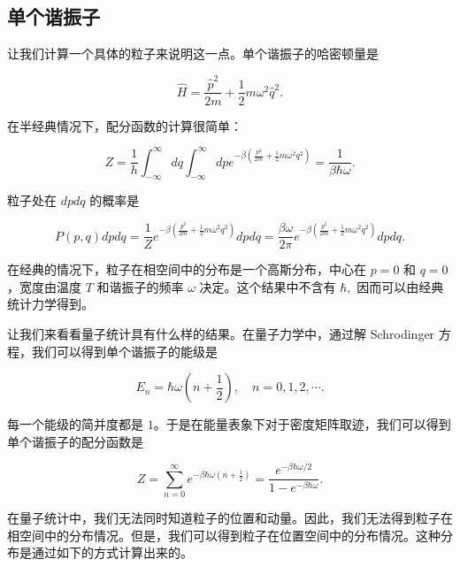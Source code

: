 \subsection{单个谐振子}
让我们计算一个具体的粒子来说明这一点。单个谐振子的哈密顿量是
\begin{linenomath}\begin{equation}
\hat{H} = \frac{\hat{p}^2}{2m} + \frac{1}{2} m \omega^2 \hat{q}^2.
\end{equation}\end{linenomath}
在半经典情况下，配分函数的计算很简单：
\begin{linenomath}\begin{equation}
    Z = \frac{1}{h} \int_{-\infty}^\infty dq \int_{-\infty}^\infty dp e^{-\beta \left( \frac{p^2}{2m} + \frac{1}{2} m \omega^2 q^2 \right)} = \frac{1}{\beta \hbar \omega}.
\end{equation}\end{linenomath}
粒子处在 $dpdq$ 的概率是
\begin{linenomath}\begin{equation}
    P(p,q) dp dq = \frac{1}{Z} e^{-\beta \left( \frac{p^2}{2m} + \frac{1}{2} m \omega^2 q^2 \right)} dp dq = \frac{\beta \omega}{2\pi} e^{-\beta \left( \frac{p^2}{2m} + \frac{1}{2} m \omega^2 q^2 \right)} dp dq.
\end{equation}\end{linenomath}
在经典的情况下，粒子在相空间中的分布是一个高斯分布，中心在 $p=0$ 和 $q=0$，宽度由温度 $T$ 和谐振子的频率 $\omega$ 决定。这个结果中不含有 $\hbar,$ 因而可以由经典统计力学得到。

让我们来看看量子统计具有什么样的结果。在量子力学中，通过解 Schrodinger 方程，我们可以得到单个谐振子的能级是
\begin{linenomath}\begin{equation}
E_n = \hbar \omega \left( n + \frac{1}{2} \right), \quad n=0,1,2,\cdots.
\end{equation}\end{linenomath}
每一个能级的简并度都是 $1$。于是在能量表象下对于密度矩阵取迹，我们可以得到单个谐振子的配分函数是
\begin{linenomath}\begin{equation}
    Z = \sum_{n=0}^\infty e^{-\beta \hbar \omega \left( n + \frac{1}{2} \right)} = \frac{e^{-\beta \hbar \omega / 2}}{1 - e^{-\beta \hbar \omega}}.
\end{equation}\end{linenomath}
在量子统计中，我们无法同时知道粒子的位置和动量。因此，我们无法得到粒子在相空间中的分布情况。但是，我们可以得到粒子在位置空间中的分布情况。这种分布是通过如下的方式计算出来的。

